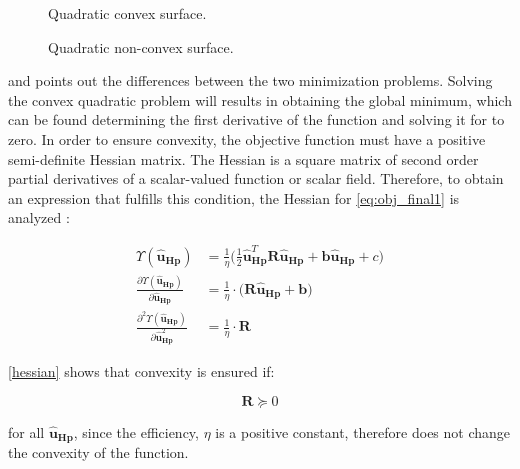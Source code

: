 \begin{figure}[H]
  \centering
  \begin{minipage}[b]{0.45\textwidth}
     
    \caption{Quadratic convex surface.}
    \label{convexfig}
  \end{minipage}
  \hfill
  \begin{minipage}[b]{0.45\textwidth}
     
    \caption{Quadratic non-convex surface.}
    \label{nonconvexfig}
  \end{minipage}
  \label{fig:nonlinearpumps}
\end{figure}

  and  points out the differences between the two minimization problems. Solving the convex quadratic problem will results in obtaining the global minimum, which can be found determining the first derivative of the function and solving it for to zero. 
 In order to ensure convexity, the objective function must have a positive semi-definite Hessian matrix. The Hessian is a square matrix of second order partial derivatives of a scalar-valued function or scalar field. Therefore, to obtain an expression that fulfills this condition, the Hessian for \eqref{eq:obj_final1} is analyzed : 

\begin{align}
%
\Upsilon(\bm{\hat{u}}_{\bm{Hp}}) &= \frac{1}{\eta}\bigg( \frac{1}{2} \bm{\hat{u}}_{\bm{Hp}}^{T} \bm{R} \bm{\hat{u}}_{\bm{Hp}} + \bm{b} \bm{\hat{u}}_{\bm{Hp}} + c \bigg)\\
%
\frac{\partial \Upsilon(\bm{\hat{u}}_{\bm{Hp}})}{\partial \bm{\hat{u}}_{\bm{Hp}}} &= \frac{1}{\eta}\cdot \big(\bm{R} \bm{\hat{u}}_{\bm{Hp}} + \bm{b} \big)\\
%
\frac{\partial^2 \Upsilon(\bm{\hat{u}}_{\bm{Hp}})}{\partial {\bm{\hat{u}}}^{2}_{\bm{Hp}}} &= \frac{1}{\eta}\cdot \bm{R} 
\label{hessian}
%
\end{align}

\eqref{hessian} shows that convexity is ensured if:

\begin{equation}
\bm{R} \succeq 0  
\end{equation}

for all $\bm{\hat{u}}_{\bm{Hp}} $, since the efficiency, $\eta$ is a positive constant, therefore does not change the convexity of the function. 

